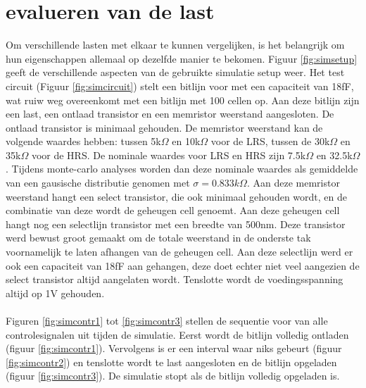 \section{evalueren van de last}
Om verschillende lasten met elkaar te kunnen vergelijken, is het belangrijk om hun eigenschappen allemaal op dezelfde manier te bekomen. Figuur \ref{fig:simsetup} geeft de verschillende aspecten van de gebruikte simulatie setup weer. Het test circuit (Figuur \ref{fig:simcircuit}) stelt een bitlijn voor met een capaciteit van 18fF, wat ruiw weg overeenkomt met een bitlijn met 100 cellen op. Aan deze bitlijn zijn een last, een ontlaad transistor en een memristor weerstand aangesloten. De ontlaad transistor is minimaal gehouden. De memristor weerstand kan de volgende waardes hebben: tussen 5k$\Omega$ en 10k$\Omega$ voor de LRS, tussen de 30k$\Omega$ en 35k$\Omega$ voor de HRS. De nominale waardes voor LRS en HRS zijn 7.5k$\Omega$ en 32.5k$\Omega$. Tijdens monte-carlo analyses worden dan deze nominale waardes als gemiddelde van een gausische distributie genomen met $\sigma = 0.833k\Omega$. Aan deze memristor weerstand hangt een select transistor, die ook minimaal gehouden wordt, en de combinatie van deze wordt de geheugen cell genoemt. Aan deze geheugen cell hangt nog een selectlijn transistor met een breedte van 500nm. Deze transistor werd bewust groot gemaakt om de totale weerstand in de onderste tak voornamelijk te laten afhangen van de geheugen cell. Aan deze selectlijn werd er ook een capaciteit van 18fF aan gehangen, deze doet echter niet veel aangezien de select transistor altijd aangelaten wordt. Tenslotte wordt de voedingsspanning altijd op 1V gehouden.\\\\
Figuren \ref{fig:simcontr1} tot \ref{fig:simcontr3} stellen de sequentie voor van alle controlesignalen uit tijden de simulatie. Eerst wordt de bitlijn volledig ontladen (figuur \ref{fig:simcontr1}). Vervolgens is er een interval waar niks gebeurt (figuur \ref{fig:simcontr2}) en tenslotte wordt te last aangesloten en de bitlijn opgeladen (figuur \ref{fig:simcontr3}). De simulatie stopt als de bitlijn volledig opgeladen is.\\

